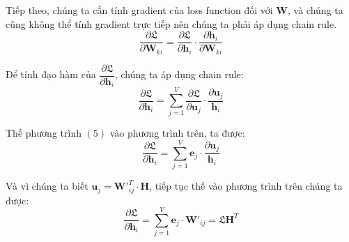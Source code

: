 \documentclass[12pt]{article}
\begin{document}
\indent Tiếp theo, chúng ta cần tính gradient của loss function đối với $\boldsymbol{W}$, và chúng ta cũng không thể tính gradient trực tiếp nên chúng ta phải áp dụng chain rule.
$$\dfrac{\partial \mathfrak{L}}{\partial \boldsymbol{W}_{ki}} = \dfrac{\partial \mathfrak{L}}{\partial \boldsymbol{h}_i} \cdot \dfrac{\partial \boldsymbol{h}_i}{\partial \boldsymbol{W}_{ki}}$$

\indent Để tính đạo hàm của $\dfrac{\partial \mathfrak{L}}{\partial \boldsymbol{h}_i}$, chúng ta áp dụng chain rule:
$$\dfrac{\partial \mathfrak{L}}{\partial \boldsymbol{h}_i} = \sum_{j=1}^V \dfrac{\partial \mathfrak{L}}{\partial \boldsymbol{u}_j} \cdot \dfrac{\partial \boldsymbol{u}_j}{\boldsymbol{h}_i}$$

\indent Thế phương trình $(5)$ vào phương trình trên, ta được:
$$\dfrac{\partial \mathfrak{L}}{\partial \boldsymbol{h}_i} = \sum_{j=1}^V \boldsymbol{e}_j \cdot \dfrac{\partial \boldsymbol{u}_j}{\boldsymbol{h}_i}$$

\indent Và vì chúng ta biết $\boldsymbol{u}_j = \boldsymbol{W'}_{ij}^T \cdot \boldsymbol{H}$, tiếp tục thế vào phương trình trên chúng ta được:
$$\dfrac{\partial \mathfrak{L}}{\partial \boldsymbol{h}_i} = \sum_{j=1}^V \boldsymbol{e}_j \cdot \boldsymbol{W'}_{ij} = \mathfrak{L}\boldsymbol{H}^T$$
\end{document}
